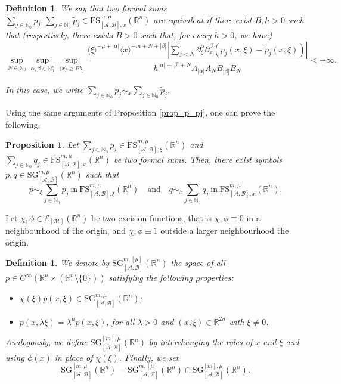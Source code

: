 \documentclass[11pt,reqno]{amsart}
\numberwithin{equation}{section}
\newtheorem{definition}[theorem]{Definition}
\newtheorem{proposition}[theorem]{Proposition}
\newcommand{\R}{{\mathbb{R}}} %
\newcommand{\N}{{\mathbb{N}}} %
\newcommand{\E}{{\mathcal{E}}}
\newcommand{\SG}{{\mathrm{SG}}}
\newcommand{\FS}{{\mathrm{FS}}}
\newcommand{\M}{{\mathcal{M}}} %
\newcommand{\A}{{\mathcal{A}}} %
\newcommand{\B}{{\mathcal{B}}} %
\begin{document}
\begin{definition}\label{def:SGcl_xeq}
	We say that two formal sums $\sum_{j\in\N_0}p_j, \sum_{j\in\N_0}\tilde{p}_j \in \FS_{[\A,\B],x}^{m,\mu}(\R^n)$ are equivalent if there exist $B,h>0$ such that (respectively, there exists $B>0$ such that, for every $h>0$, we have)
	\begin{equation*}
		\sup_{N\in\N_0}\sup_{\alpha,\beta\in\N_0^n}\sup_{\langle x\rangle\geq Bb_j} \frac{\langle\xi\rangle^{-\mu+|\alpha|}\langle x\rangle^{-m+N+|\beta|} \left| \sum_{j<N}\partial_\xi^\alpha\partial_x^\beta(p_j(x,\xi)-\tilde{p}_j(x,\xi))\right|}{h^{|\alpha|+|\beta|+N} A_{|\alpha|}A_NB_{|\beta|}B_N} < +\infty.
	\end{equation*}
	
	In this case, we write $\sum_{j\in\N_0}p_j \sim_x \sum_{j\in\N_0}\tilde{p}_j$.
\end{definition}


Using the same arguments of Proposition \ref{prop_p_pj}, one can prove the following.


\begin{proposition}
	Let $\sum_{j\in\N_0}p_j\in \FS_{[\A,\B],\xi}^{m,\mu}(\R^n)$ and $\sum_{j\in\N_0}q_j\in \FS_{[\A,\B],x}^{m,\mu}(\R^n)$ be two formal sums. Then, there exist symbols $p,q\in {\SG}_{[\A,\B]}^{m,\mu}(\R^n)$ such that
	\[p\sim_\xi \sum_{j\in\N_0}p_j\ \text{in}\ \FS_{[\A,\B],\xi}^{m,\mu}(\R^n) \quad\text{and}\quad q\sim_x\sum_{j\in\N_0}q_j\ \text{in}\ \FS_{[\A,\B],x}^{m,\mu}(\R^n).\]
\end{proposition}



Let $\chi,\phi\in\E_{[\M]}(\R^n)$ be two excision functions, that is $\chi,\phi\equiv 0$ in a neighbourhood of the origin, and $\chi,\phi\equiv 1$ outside a larger 
neighbourhood the origin. 


\begin{definition}
	We denote by ${\SG}_{[\A,\B]}^{m,[\mu]}(\R^n)$ the space of all $p\in C^\infty(\R^n\times(\R^n\setminus\{0\}))$ satisfying the following properties:
	\begin{itemize}
		\item $\chi(\xi)p(x,\xi) \in {\SG}_{[\A,\B]}^{m,\mu}(\R^n)$;
		\item $p(x,\lambda\xi)=\lambda^{\mu}p(x,\xi)$, for all $\lambda>0$ and $(x,\xi)\in\R^{2n}$ with $\xi\neq 0$.
	\end{itemize}
	
	  Analogously, we define ${\SG}_{[\A,\B]}^{[m],\mu}(\R^n)$ by interchanging the roles of $x$ and $\xi$ and using $\phi(x)$ in place of $\chi(\xi)$. Finally, we set
	  \[{\SG}_{[\A,\B]}^{[m,\mu]}(\R^n) = {\SG}_{[\A,\B]}^{m,[\mu]}(\R^n)\cap {\SG}_{[\A,\B]}^{[m],\mu}(\R^n).\]
\end{definition}
\end{document}
